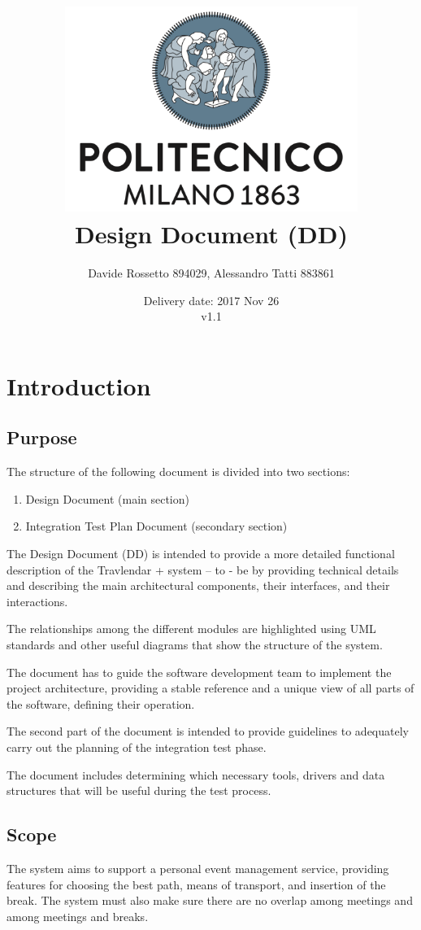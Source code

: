 \documentclass{article}
\title{ 
	\includegraphics[width=95mm]{img/PolimiLogo.png} \\
	\bigskip
	Design Document (DD)
}
\author{
	Davide Rossetto 894029, Alessandro Tatti 883861
}
\date{
	Delivery date: 2017 Nov 26\\
	\bigskip v1.1
}
\begin{document}
	
\maketitle
\newpage
\tableofcontents
\newpage
	
	
	\section{Introduction}
	

	\subsection{Purpose}
	The structure of the following document is divided into two sections:
	\begin{enumerate}
	\item Design Document (main section)
	\item Integration Test Plan Document (secondary section)
	\end{enumerate}

	\bigskip
	The Design Document (DD) is intended to provide a more detailed functional description of the Travlendar + system – to - be by providing technical details and describing the main architectural components, their interfaces, and their interactions.
	
	The relationships among the different modules are highlighted using UML standards and other useful diagrams that show the structure of the system.
	
	The document has to guide the software development team to implement the project architecture, providing a stable reference and a unique view of all parts of the software, defining their operation.

	\bigskip
	The second part of the document is intended to provide guidelines to adequately carry out the planning of the integration test phase.
	
	The document includes determining which necessary tools, drivers and data structures that will be useful during the test process.

	
	
	\subsection{Scope}
	The system aims to support a personal event management service, providing features for choosing the best path, means of transport, and insertion of the break. The system must also make sure there are no overlap among meetings and among meetings and breaks.
\end{document}
